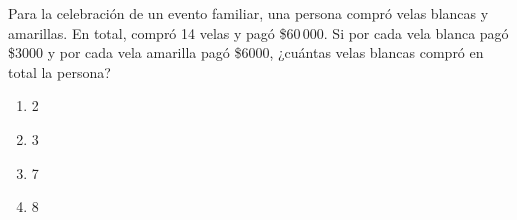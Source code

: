 \begin{problem}
    Para la celebración de un evento familiar, una persona compró velas blancas y amarillas. En total, compró 14 velas y pagó \$60\,000. Si por cada vela blanca pagó \$3000 y por cada vela amarilla pagó \$6000, ¿cuántas velas blancas compró en total la persona?

    \begin{enumerate}[label=\Alph*.]
        \item 2
        \item 3
        \item 7
        \item 8
    \end{enumerate}
\end{problem}
